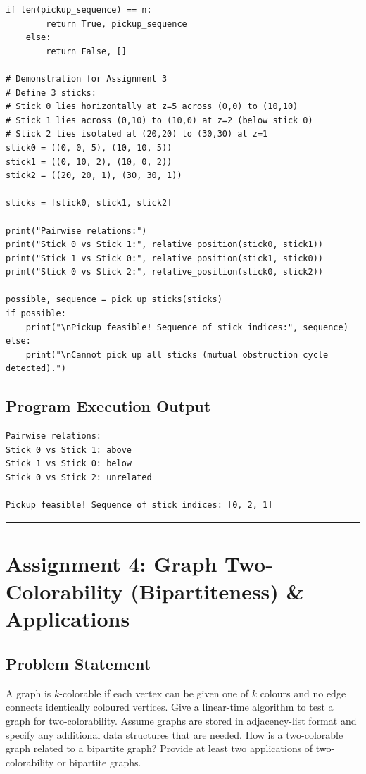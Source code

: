 \documentclass[12pt]{article}
\begin{document}
\begin{lstlisting}[style=code]
    if len(pickup_sequence) == n:
        return True, pickup_sequence
    else:
        return False, []

# Demonstration for Assignment 3
# Define 3 sticks:
# Stick 0 lies horizontally at z=5 across (0,0) to (10,10)
# Stick 1 lies across (0,10) to (10,0) at z=2 (below stick 0)
# Stick 2 lies isolated at (20,20) to (30,30) at z=1
stick0 = ((0, 0, 5), (10, 10, 5))
stick1 = ((0, 10, 2), (10, 0, 2))
stick2 = ((20, 20, 1), (30, 30, 1))

sticks = [stick0, stick1, stick2]

print("Pairwise relations:")
print("Stick 0 vs Stick 1:", relative_position(stick0, stick1))
print("Stick 1 vs Stick 0:", relative_position(stick1, stick0))
print("Stick 0 vs Stick 2:", relative_position(stick0, stick2))

possible, sequence = pick_up_sticks(sticks)
if possible:
    print("\nPickup feasible! Sequence of stick indices:", sequence)
else:
    print("\nCannot pick up all sticks (mutual obstruction cycle detected).")
\end{lstlisting}

\subsection*{Program Execution Output}
\begin{lstlisting}[style=output]
Pairwise relations:
Stick 0 vs Stick 1: above
Stick 1 vs Stick 0: below
Stick 0 vs Stick 2: unrelated

Pickup feasible! Sequence of stick indices: [0, 2, 1]
\end{lstlisting}

\vspace{0.5cm}
\hrule
\vspace{0.5cm}

\section*{Assignment 4: Graph Two-Colorability (Bipartiteness) \& Applications}

\subsection*{Problem Statement}
A graph is $k$-colorable if each vertex can be given one of $k$ colours and no edge connects identically coloured vertices. Give a linear-time algorithm to test a graph for two-colorability. Assume graphs are stored in adjacency-list format and specify any additional data structures that are needed. How is a two-colorable graph related to a bipartite graph? Provide at least two applications of two-colorability or bipartite graphs.
\end{document}
